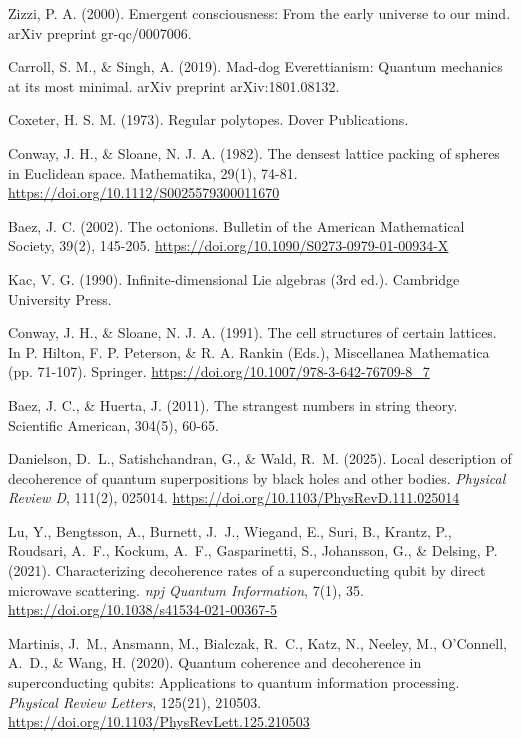 \documentclass[11pt,english,twoside]{article}
\begin{document}
\begin{thebibliography}{99}
 Zizzi, P. A. (2000). Emergent consciousness: From the early universe to our mind. arXiv preprint gr-qc/0007006.

 Carroll, S. M., \& Singh, A. (2019). Mad-dog Everettianism: Quantum mechanics at its most minimal. arXiv preprint arXiv:1801.08132.

 Coxeter, H. S. M. (1973). Regular polytopes. Dover Publications.

 Conway, J. H., \& Sloane, N. J. A. (1982). The densest lattice packing of spheres in Euclidean space. Mathematika, 29(1), 74-81. \href{https://doi.org/10.1112/S0025579300011670}{https://doi.org/10.1112/S0025579300011670}

 Baez, J. C. (2002). The octonions. Bulletin of the American Mathematical Society, 39(2), 145-205. \href{https://doi.org/10.1090/S0273-0979-01-00934-X}{https://doi.org/10.1090/S0273-0979-01-00934-X}

 Kac, V. G. (1990). Infinite-dimensional Lie algebras (3rd ed.). Cambridge University Press.

 Conway, J. H., \& Sloane, N. J. A. (1991). The cell structures of certain lattices. In P. Hilton, F. P. Peterson, \& R. A. Rankin (Eds.), Miscellanea Mathematica (pp. 71-107). Springer. \href{https://doi.org/10.1007/978-3-642-76709-8_7}{https://doi.org/10.1007/978-3-642-76709-8\_7}

 Baez, J. C., \& Huerta, J. (2011). The strangest numbers in string theory. Scientific American, 304(5), 60-65.

 Danielson, D.~L., Satishchandran, G., \& Wald, R.~M. (2025). Local description of decoherence of quantum superpositions by black holes and other bodies. \textit{Physical Review D}, 111(2), 025014. \href{https://doi.org/10.1103/PhysRevD.111.025014}{https://doi.org/10.1103/PhysRevD.111.025014}

 Lu, Y., Bengtsson, A., Burnett, J.~J., Wiegand, E., Suri, B., Krantz, P., Roudsari, A.~F., Kockum, A.~F., Gasparinetti, S., Johansson, G., \& Delsing, P. (2021). Characterizing decoherence rates of a superconducting qubit by direct microwave scattering. \textit{npj Quantum Information}, 7(1), 35. \href{https://doi.org/10.1038/s41534-021-00367-5}{https://doi.org/10.1038/s41534-021-00367-5}

 Martinis, J.~M., Ansmann, M., Bialczak, R.~C., Katz, N., Neeley, M., O'Connell, A.~D., \& Wang, H. (2020). Quantum coherence and decoherence in superconducting qubits: Applications to quantum information processing. \textit{Physical Review Letters}, 125(21), 210503. \href{https://doi.org/10.1103/PhysRevLett.125.210503}{https://doi.org/10.1103/PhysRevLett.125.210503}


\end{thebibliography}
\end{document}
